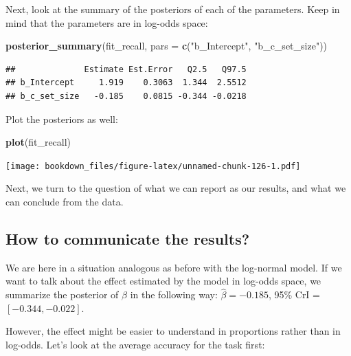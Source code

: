 \documentclass[12pt,]{krantz}
\newenvironment{Shaded}{\begin{snugshade}}{\end{snugshade}}
\newcommand{\KeywordTok}[1]{\textcolor[rgb]{0.13,0.29,0.53}{\textbf{#1}}}
\newcommand{\DataTypeTok}[1]{\textcolor[rgb]{0.13,0.29,0.53}{#1}}
\newcommand{\DecValTok}[1]{\textcolor[rgb]{0.00,0.00,0.81}{#1}}
\newcommand{\StringTok}[1]{\textcolor[rgb]{0.31,0.60,0.02}{#1}}
\newcommand{\OperatorTok}[1]{\textcolor[rgb]{0.81,0.36,0.00}{\textbf{#1}}}
\newcommand{\NormalTok}[1]{#1}
\theoremstyle{definition}
\theoremstyle{definition}
\theoremstyle{definition}
\theoremstyle{remark}
\begin{document}
Next, look at the summary of the posteriors of each of the parameters.
Keep in mind that the parameters are in log-odds space:

\begin{Shaded}
\begin{Highlighting}[]
\KeywordTok{posterior_summary}\NormalTok{(fit_recall, }\DataTypeTok{pars =} \KeywordTok{c}\NormalTok{(}\StringTok{"b_Intercept"}\NormalTok{, }\StringTok{"b_c_set_size"}\NormalTok{))}
\end{Highlighting}
\end{Shaded}

\begin{verbatim}
##              Estimate Est.Error   Q2.5   Q97.5
## b_Intercept     1.919    0.3063  1.344  2.5512
## b_c_set_size   -0.185    0.0815 -0.344 -0.0218
\end{verbatim}

Plot the posteriors as well:

\begin{Shaded}
\begin{Highlighting}[]
\KeywordTok{plot}\NormalTok{(fit_recall)}
\end{Highlighting}
\end{Shaded}

\texttt{[image: bookdown\_files/figure-latex/unnamed-chunk-126-1.pdf]}

Next, we turn to the question of what we can report as our results, and
what we can conclude from the data.

\subsection{How to communicate the results?}\label{sec:comlogis}

We are here in a situation analogous as before with the log-normal
model. If we want to talk about the effect estimated by the model in
log-odds space, we summarize the posterior of \(\beta\) in the following
way: \(\hat\beta = -0.185\), 95\% CrI = \([ -0.344 , -0.022 ]\).

However, the effect might be easier to understand in proportions rather
than in log-odds. Let's look at the average accuracy for the task first:

\begin{Shaded}
\end{Shaded}
\end{document}
